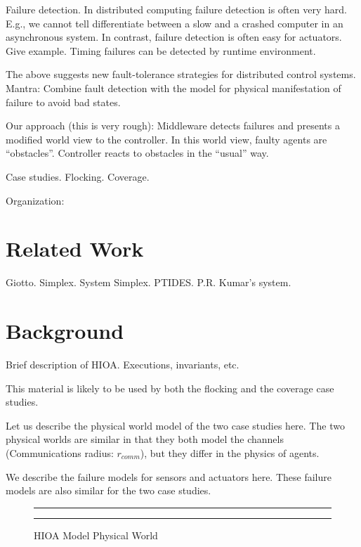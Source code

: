 \documentclass[10pt, conference, compsocconf]{IEEEtran}
\begin{document}
Failure detection.
In distributed computing failure detection is often very hard.
E.g., we cannot tell differentiate between a slow and
a crashed computer in an asynchronous system.
In contrast, failure detection is often easy 
for actuators. Give example.  
Timing failures can be detected by runtime environment.

The above suggests new fault-tolerance strategies
for distributed control systems.
Mantra: 
Combine fault detection with the model for physical manifestation
of failure to avoid bad states. 

Our approach (this is very rough):
Middleware detects failures and presents a modified 
world view to the controller. In this world view, faulty agents
are ``obstacles''. Controller reacts to obstacles in the ``usual'' way.

Case studies. Flocking. Coverage.

Organization:

\section{Related Work}
\label{sec:rw}
Giotto. 
Simplex.  System Simplex.
PTIDES.  
P.R. Kumar's system.

\section{Background}
\label{sec:basics}
Brief description of HIOA.
Executions, invariants, etc.

This material is likely to be used by
both the flocking and the coverage 
case studies.

%
Let us describe the 
physical world model of the two case studies here.
%
The two physical worlds are similar in that
they both model the channels (Communications radius: $r_{comm}$), 
but they differ in the physics of agents. 
%



We describe the failure models for sensors 
and actuators here. These failure models are also 
similar for the two case studies. 

\begin{figure}[h!]
\centering
  \hrule
  {}
  \hrule
  \caption{HIOA Model Physical World}
  \label{fig:physicalWorld}
\end{figure}
\end{document}

